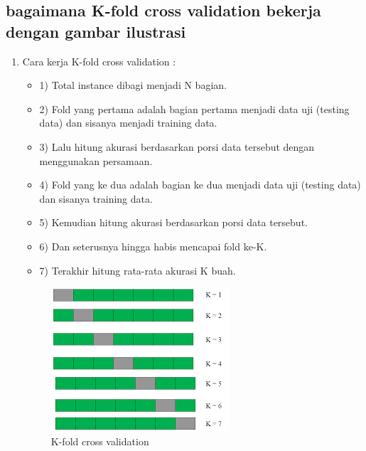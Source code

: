 \subsection{bagaimana K-fold cross validation bekerja dengan gambar ilustrasi}
\begin{enumerate}
\item Cara kerja K-fold cross validation :
\begin{itemize}
\item 1)	Total instance dibagi menjadi N bagian.
\item 2)	Fold yang pertama adalah bagian pertama menjadi data uji (testing data) dan sisanya menjadi training data.
\item 3)	Lalu hitung akurasi berdasarkan porsi data tersebut dengan menggunakan persamaan.
\item 4)	Fold yang ke dua adalah bagian ke dua menjadi data uji (testing data) dan sisanya training data. 
\item 5)	Kemudian hitung akurasi berdasarkan porsi data tersebut.
\item 6)	Dan seterusnya hingga habis mencapai fold ke-K.
\item 7)	Terakhir hitung rata-rata akurasi K buah.
\end{itemize}
\begin{figure}[ht]
\centering
\includegraphics[scale=0.5]{figures/AFS/andri6.png}
\caption{K-fold cross validation }
\label{contoh}
\end{figure}
\end{enumerate}

